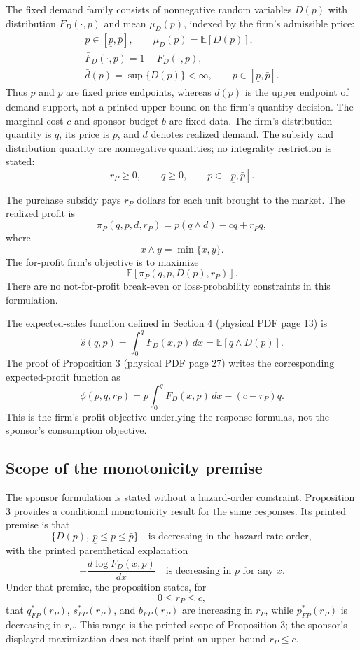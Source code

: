 \documentclass{article}
\begin{document}
The fixed demand family consists of nonnegative random variables $D(p)$ with distribution $F_D(\cdot,p)$ and mean $\mu_D(p)$, indexed by the firm's admissible price:
\begin{gather*}
p\in[\underline p,\bar p],\qquad
\mu_D(p)=\mathbb E[D(p)],\\
\bar F_D(\cdot,p)=1-F_D(\cdot,p),\\
\bar d(p)=\sup\{D(p)\}<\infty,
\qquad p\in[\underline p,\bar p].
\end{gather*}
Thus $\underline p$ and $\bar p$ are fixed price endpoints, whereas $\bar d(p)$ is the upper endpoint of demand support, not a printed upper bound on the firm's quantity decision. The marginal cost $c$ and sponsor budget $b$ are fixed data. The firm's distribution quantity is $q$, its price is $p$, and $d$ denotes realized demand. The subsidy and distribution quantity are nonnegative quantities; no integrality restriction is stated:
\[
r_P\geq0,\qquad q\geq0,\qquad p\in[\underline p,\bar p].
\]

The purchase subsidy pays $r_P$ dollars for each unit brought to the market. The realized profit is
\begin{equation}
\pi_P(q,p,d,r_P)=p(q\wedge d)-cq+r_Pq,
\tag{1}
\end{equation}
where
\[
x\wedge y=\min\{x,y\}.
\]
The for-profit firm's objective is to maximize
\[
\mathbb E[\pi_P(q,p,D(p),r_P)].
\]
There are no not-for-profit break-even or loss-probability constraints in this formulation.

The expected-sales function defined in Section 4 (physical PDF page 13) is
\[
\hat s(q,p)=\int_0^q\bar F_D(x,p)\,dx
           =\mathbb E[q\wedge D(p)].
\]
The proof of Proposition 3 (physical PDF page 27) writes the corresponding expected-profit function as
\[
\phi(p,q,r_P)=p\int_0^q\bar F_D(x,p)\,dx-(c-r_P)q.
\]
This is the firm's profit objective underlying the response formulas, not the sponsor's consumption objective.

\subsection*{Scope of the monotonicity premise}

The sponsor formulation is stated without a hazard-order constraint. Proposition 3 provides a conditional monotonicity result for the same responses. Its printed premise is that
\[
\{D(p),\ \underline p\leq p\leq\bar p\}
\quad\text{is decreasing in the hazard rate order},
\]
with the printed parenthetical explanation
\[
-\frac{d\log\bar F_D(x,p)}{dx}
\quad\text{is decreasing in $p$ for any $x$}.
\]
Under that premise, the proposition states, for
\[
0\leq r_P\leq c,
\]
that $q_{FP}^{*}(r_P)$, $s_{FP}^{*}(r_P)$, and $b_{FP}(r_P)$ are increasing in $r_P$, while $p_{FP}^{*}(r_P)$ is decreasing in $r_P$. This range is the printed scope of Proposition 3; the sponsor's displayed maximization does not itself print an upper bound $r_P\leq c$.
\end{document}
